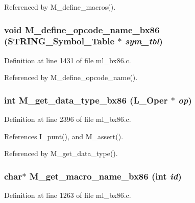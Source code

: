 Referenced by M\_\-define\_\-macros().
\subsubsection{\setlength{\rightskip}{0pt plus 5cm}void M\_\-define\_\-opcode\_\-name\_\-bx86 (\bf{STRING\_\-Symbol\_\-Table} $\ast$ {\em sym\_\-tbl})}\label{ml__bx86_8c_f6c7f2a7412c8d3dd02b327d8830432e}




Definition at line 1431 of file ml\_\-bx86.c.

Referenced by M\_\-define\_\-opcode\_\-name().
\subsubsection{\setlength{\rightskip}{0pt plus 5cm}int M\_\-get\_\-data\_\-type\_\-bx86 (L\_\-Oper $\ast$ {\em op})}\label{ml__bx86_8c_a7d1f699532530fd65054fbf757cf766}




Definition at line 2396 of file ml\_\-bx86.c.

References I\_\-punt(), and M\_\-assert().

Referenced by M\_\-get\_\-data\_\-type().
\subsubsection{\setlength{\rightskip}{0pt plus 5cm}char$\ast$ M\_\-get\_\-macro\_\-name\_\-bx86 (int {\em id})}\label{ml__bx86_8c_60523ef5cc26fa6fbb39603bf8397e01}




Definition at line 1263 of file ml\_\-bx86.c.


